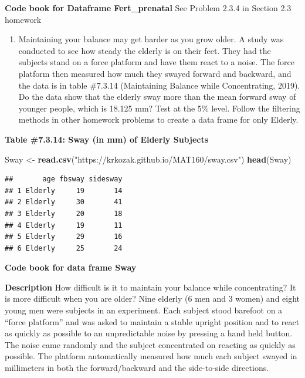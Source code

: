 \documentclass[
]{book}
\newenvironment{Shaded}{\begin{snugshade}}{\end{snugshade}}
\newcommand{\KeywordTok}[1]{\textcolor[rgb]{0.13,0.29,0.53}{\textbf{#1}}}
\newcommand{\NormalTok}[1]{#1}
\newcommand{\StringTok}[1]{\textcolor[rgb]{0.31,0.60,0.02}{#1}}
\providecommand{\tightlist}{%
  \setlength{\itemsep}{0pt}\setlength{\parskip}{0pt}}
\begin{document}
\textbf{Code book for Dataframe Fert\_prenatal} See Problem 2.3.4 in Section 2.3 homework

\begin{enumerate}
\def\labelenumi{\arabic{enumi}.}
\setcounter{enumi}{6}
\tightlist
\item
  Maintaining your balance may get harder as you grow older. A study was conducted to see how steady the elderly is on their feet. They had the subjects stand on a force platform and have them react to a noise. The force platform then measured how much they swayed forward and backward, and the data is in table \#7.3.14 (Maintaining Balance while Concentrating, 2019). Do the data show that the elderly sway more than the mean forward sway of younger people, which is 18.125 mm? Test at the 5\% level. Follow the filtering methods in other homework problems to create a data frame for only Elderly.
\end{enumerate}

\textbf{Table \#7.3.14: Sway (in mm) of Elderly Subjects}

\begin{Shaded}
\begin{Highlighting}[]
\NormalTok{Sway <-}\StringTok{ }\KeywordTok{read.csv}\NormalTok{(}\StringTok{"https://krkozak.github.io/MAT160/sway.csv"}\NormalTok{)}
\KeywordTok{head}\NormalTok{(Sway)}
\end{Highlighting}
\end{Shaded}

\begin{verbatim}
##       age fbsway sidesway
## 1 Elderly     19       14
## 2 Elderly     30       41
## 3 Elderly     20       18
## 4 Elderly     19       11
## 5 Elderly     29       16
## 6 Elderly     25       24
\end{verbatim}

\textbf{Code book for data frame Sway}

\textbf{Description}
How difficult is it to maintain your balance while concentrating? It is more difficult when you are older? Nine elderly (6 men and 3 women) and eight young men were subjects in an experiment. Each subject stood barefoot on a ``force platform'' and was asked to maintain a stable upright position and to react as quickly as possible to an unpredictable noise by pressing a hand held button. The noise came randomly and the subject concentrated on reacting as quickly as possible. The platform automatically measured how much each subject swayed in millimeters in both the forward/backward and the side-to-side directions.
\end{document}
